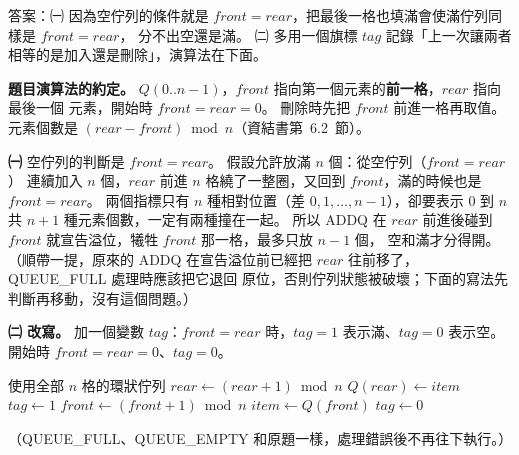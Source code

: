 \begin{pastsoln}
答案：㈠ 因為空佇列的條件就是 $\mathit{front} = \mathit{rear}$，把最後一格也填滿會使滿佇列同樣是 $\mathit{front} = \mathit{rear}$，
分不出空還是滿。 ㈡ 多用一個旗標 $\mathit{tag}$ 記錄「上一次讓兩者相等的是加入還是刪除」，演算法在下面。

\textbf{題目演算法的約定。} $Q(0..n-1)$，$\mathit{front}$ 指向第一個元素的\textbf{前一格}，$\mathit{rear}$ 指向最後一個
元素，開始時 $\mathit{front} = \mathit{rear} = 0$。 刪除時先把 $\mathit{front}$ 前進一格再取值。 元素個數是
$(\mathit{rear} - \mathit{front}) \bmod n$（資結書第~6.2~節）。

\textbf{㈠} 空佇列的判斷是 $\mathit{front} = \mathit{rear}$。 假設允許放滿 $n$ 個：從空佇列（$\mathit{front} = \mathit{rear}$）
連續加入 $n$ 個，$\mathit{rear}$ 前進 $n$ 格繞了一整圈，又回到 $\mathit{front}$，滿的時候也是 $\mathit{front} = \mathit{rear}$。
兩個指標只有 $n$ 種相對位置（差 $0, 1, \dots, n - 1$），卻要表示 $0$ 到 $n$ 共 $n + 1$ 種元素個數，一定有兩種撞在一起。
所以 ADDQ 在 $\mathit{rear}$ 前進後碰到 $\mathit{front}$ 就宣告溢位，犧牲 $\mathit{front}$ 那一格，最多只放 $n - 1$ 個，
空和滿才分得開。 （順帶一提，原來的 ADDQ 在宣告溢位前已經把 $\mathit{rear}$ 往前移了，QUEUE\_FULL 處理時應該把它退回
原位，否則佇列狀態被破壞；下面的寫法先判斷再移動，沒有這個問題。）

\textbf{㈡ 改寫。} 加一個變數 $\mathit{tag}$：$\mathit{front} = \mathit{rear}$ 時，$\mathit{tag} = 1$ 表示滿、$\mathit{tag} = 0$ 表示空。
開始時 $\mathit{front} = \mathit{rear} = 0$、$\mathit{tag} = 0$。
\begin{pseudo}{使用全部 $n$ 格的環狀佇列}
        \State {} 
    \EndIf
    \State $\mathit{rear} \gets (\mathit{rear} + 1) \bmod n$
    \State $Q(\mathit{rear}) \gets \mathit{item}$
        \State $\mathit{tag} \gets 1$ 
    \EndIf
\EndProcedure
\Statex
{}
        \State {}
    \EndIf
    \State $\mathit{front} \gets (\mathit{front} + 1) \bmod n$
    \State $\mathit{item} \gets Q(\mathit{front})$
    \State $\mathit{tag} \gets 0$ 
\EndProcedure
\end{pseudo}
（QUEUE\_FULL、QUEUE\_EMPTY 和原題一樣，處理錯誤後不再往下執行。）


\end{pastsoln}
